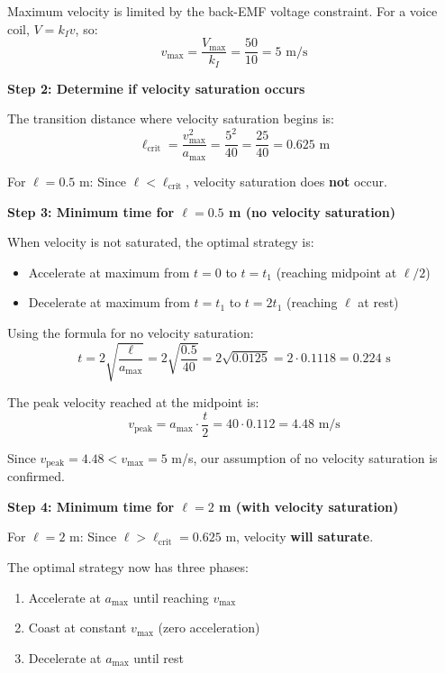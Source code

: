 \documentclass[11pt,a4paper]{article}
\begin{document}
Maximum velocity is limited by the back-EMF voltage constraint. For a voice coil, $V = k_I v$, so:
\begin{equation}
	v_{\max} = \frac{V_{\max}}{k_I} = \frac{50}{10} = 5 \text{ m/s}
\end{equation}

\textbf{Step 2: Determine if velocity saturation occurs}

The transition distance where velocity saturation begins is:
\begin{equation}
	\ell_{\text{crit}} = \frac{v_{\max}^2}{a_{\max}} = \frac{5^2}{40} = \frac{25}{40} = 0.625 \text{ m}
\end{equation}

For $\ell = 0.5$ m: Since $\ell < \ell_{\text{crit}}$, velocity saturation does \textbf{not} occur.

\textbf{Step 3: Minimum time for $\ell = 0.5$ m (no velocity saturation)}

When velocity is not saturated, the optimal strategy is:
\begin{itemize}
\item Accelerate at maximum from $t = 0$ to $t = t_1$ (reaching midpoint at $\ell/2$)
\item Decelerate at maximum from $t = t_1$ to $t = 2t_1$ (reaching $\ell$ at rest)
\end{itemize}

Using the formula for no velocity saturation:
\begin{equation}
	t = 2\sqrt{\frac{\ell}{a_{\max}}} = 2\sqrt{\frac{0.5}{40}} = 2\sqrt{0.0125} = 2 \cdot 0.1118 = 0.224 \text{ s}
\end{equation}

The peak velocity reached at the midpoint is:
\begin{equation}
	v_{\text{peak}} = a_{\max} \cdot \frac{t}{2} = 40 \cdot 0.112 = 4.48 \text{ m/s}
\end{equation}

Since $v_{\text{peak}} = 4.48 < v_{\max} = 5$ m/s, our assumption of no velocity saturation is confirmed.

\textbf{Step 4: Minimum time for $\ell = 2$ m (with velocity saturation)}

For $\ell = 2$ m: Since $\ell > \ell_{\text{crit}} = 0.625$ m, velocity \textbf{will saturate}.

The optimal strategy now has three phases:
\begin{enumerate}
\item Accelerate at $a_{\max}$ until reaching $v_{\max}$
\item Coast at constant $v_{\max}$ (zero acceleration)
\item Decelerate at $a_{\max}$ until rest
\end{enumerate}
\end{document}
